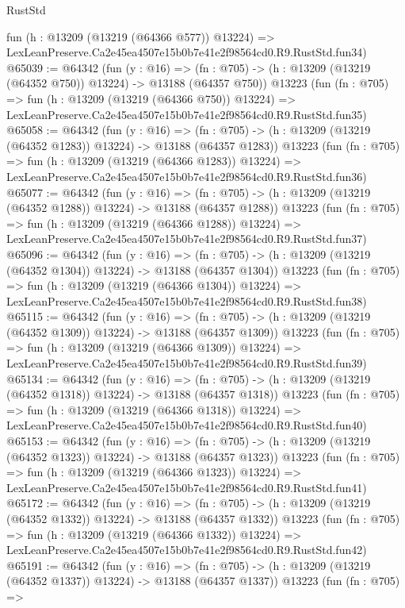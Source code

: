 \begin{lexlean}{RustStd}
\begin{coremodule}
    fun (h : @13209 (@13219 (@64366 @577)) @13224) =>
    LexLeanPreserve.Ca2e45ea4507e15b0b7e41e2f98564cd0.R9.RustStd.fun34)
@65039 := @64342
    (fun (y : @16) =>
    (fn : @705) -> (h : @13209 (@13219 (@64352 @750)) @13224) -> @13188 (@64357 @750))
    @13223
    (fun (fn : @705) =>
    fun (h : @13209 (@13219 (@64366 @750)) @13224) =>
    LexLeanPreserve.Ca2e45ea4507e15b0b7e41e2f98564cd0.R9.RustStd.fun35)
@65058 := @64342
    (fun (y : @16) =>
    (fn : @705) -> (h : @13209 (@13219 (@64352 @1283)) @13224) -> @13188 (@64357 @1283))
    @13223
    (fun (fn : @705) =>
    fun (h : @13209 (@13219 (@64366 @1283)) @13224) =>
    LexLeanPreserve.Ca2e45ea4507e15b0b7e41e2f98564cd0.R9.RustStd.fun36)
@65077 := @64342
    (fun (y : @16) =>
    (fn : @705) -> (h : @13209 (@13219 (@64352 @1288)) @13224) -> @13188 (@64357 @1288))
    @13223
    (fun (fn : @705) =>
    fun (h : @13209 (@13219 (@64366 @1288)) @13224) =>
    LexLeanPreserve.Ca2e45ea4507e15b0b7e41e2f98564cd0.R9.RustStd.fun37)
@65096 := @64342
    (fun (y : @16) =>
    (fn : @705) -> (h : @13209 (@13219 (@64352 @1304)) @13224) -> @13188 (@64357 @1304))
    @13223
    (fun (fn : @705) =>
    fun (h : @13209 (@13219 (@64366 @1304)) @13224) =>
    LexLeanPreserve.Ca2e45ea4507e15b0b7e41e2f98564cd0.R9.RustStd.fun38)
@65115 := @64342
    (fun (y : @16) =>
    (fn : @705) -> (h : @13209 (@13219 (@64352 @1309)) @13224) -> @13188 (@64357 @1309))
    @13223
    (fun (fn : @705) =>
    fun (h : @13209 (@13219 (@64366 @1309)) @13224) =>
    LexLeanPreserve.Ca2e45ea4507e15b0b7e41e2f98564cd0.R9.RustStd.fun39)
@65134 := @64342
    (fun (y : @16) =>
    (fn : @705) -> (h : @13209 (@13219 (@64352 @1318)) @13224) -> @13188 (@64357 @1318))
    @13223
    (fun (fn : @705) =>
    fun (h : @13209 (@13219 (@64366 @1318)) @13224) =>
    LexLeanPreserve.Ca2e45ea4507e15b0b7e41e2f98564cd0.R9.RustStd.fun40)
@65153 := @64342
    (fun (y : @16) =>
    (fn : @705) -> (h : @13209 (@13219 (@64352 @1323)) @13224) -> @13188 (@64357 @1323))
    @13223
    (fun (fn : @705) =>
    fun (h : @13209 (@13219 (@64366 @1323)) @13224) =>
    LexLeanPreserve.Ca2e45ea4507e15b0b7e41e2f98564cd0.R9.RustStd.fun41)
@65172 := @64342
    (fun (y : @16) =>
    (fn : @705) -> (h : @13209 (@13219 (@64352 @1332)) @13224) -> @13188 (@64357 @1332))
    @13223
    (fun (fn : @705) =>
    fun (h : @13209 (@13219 (@64366 @1332)) @13224) =>
    LexLeanPreserve.Ca2e45ea4507e15b0b7e41e2f98564cd0.R9.RustStd.fun42)
@65191 := @64342
    (fun (y : @16) =>
    (fn : @705) -> (h : @13209 (@13219 (@64352 @1337)) @13224) -> @13188 (@64357 @1337))
    @13223
    (fun (fn : @705) =>

\end{coremodule}
\end{lexlean}
